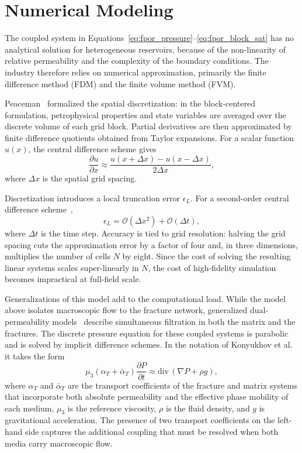 \section{Numerical Modeling}
\label{sec:numerical_challenges}

The coupled system in Equations~\ref{eq:fpor_pressure}--\ref{eq:fpor_block_sat} has no analytical solution for heterogeneous reservoirs, because of the non-linearity of relative permeability and the complexity of the boundary conditions. The industry therefore relies on numerical approximation, primarily the finite difference method (FDM) and the finite volume method (FVM).

Peaceman~\cite{peaceman1977fundamentals} formalized the spatial discretization: in the block-centered formulation, petrophysical properties and state variables are averaged over the discrete volume of each grid block. Partial derivatives are then approximated by finite difference quotients obtained from Taylor expansions. For a scalar function $u(x)$, the central difference scheme gives
\begin{equation}
    \frac{\partial u}{\partial x} \approx \frac{u(x + \Delta x) - u(x - \Delta x)}{2\Delta x},
    \label{eq:central_diff}
\end{equation}
where $\Delta x$ is the spatial grid spacing.

Discretization introduces a local truncation error $\epsilon_L$. For a second-order central difference scheme~\cite{peaceman1977fundamentals},
\begin{equation}
    \epsilon_L = \mathcal{O}(\Delta x^2) + \mathcal{O}(\Delta t),
\end{equation}
where $\Delta t$ is the time step. Accuracy is tied to grid resolution: halving the grid spacing cuts the approximation error by a factor of four and, in three dimensions, multiplies the number of cells $N$ by eight. Since the cost of solving the resulting linear systems scales super-linearly in $N$, the cost of high-fidelity simulation becomes impractical at full-field scale.

Generalizations of this model add to the computational load. While the model above isolates macroscopic flow to the fracture network, generalized dual-permeability models~\cite{konyukhov2019numerical, volkov2016numerical} describe simultaneous filtration in both the matrix and the fractures. The discrete pressure equation for these coupled systems is parabolic and is solved by implicit difference schemes. In the notation of Konyukhov et al.~\cite{konyukhov2019numerical} it takes the form
\begin{equation}
    \mu_3 (\alpha_T + \bar{\alpha}_T) \frac{\partial P}{\partial t} \approx \text{div}\,(\nabla P + \rho g),
    \label{eq:pressure_discrete}
\end{equation}
where $\alpha_T$ and $\bar{\alpha}_T$ are the transport coefficients of the fracture and matrix systems that incorporate both absolute permeability and the effective phase mobility of each medium, $\mu_3$ is the reference viscosity, $\rho$ is the fluid density, and $g$ is gravitational acceleration. The presence of two transport coefficients on the left-hand side captures the additional coupling that must be resolved when both media carry macroscopic flow.

